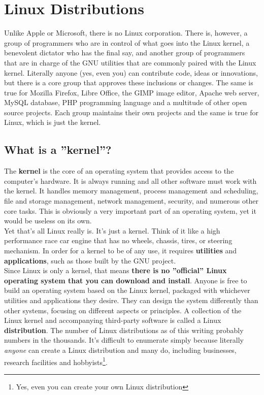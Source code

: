 \section{Linux Distributions}

Unlike Apple or Microsoft, there is no Linux corporation. There is, however, a group of programmers who are in control of what goes into the Linux kernel, a benevolent dictator who has the final say, and another group of programmers that are in charge of the GNU utilities that are commonly paired with the Linux kernel.  Literally anyone (yes, even you) can contribute code, ideas or innovations, but there is a core group that approves these inclusions or changes.  The same is true for Mozilla Firefox, Libre Office, the GIMP image editor, Apache web server, MySQL database, PHP programming language and a multitude of other open source projects.  Each group maintains their own projects and the same is true for Linux, which is just the kernel.\\

\subsection{What is a ''kernel''?}

The \textbf{kernel} is the core of an operating system that provides access to the computer's hardware.  It is always running and all other software must work with the kernel. It handles memory management, process management and scheduling, file and storage management, network management, security, and numerous other core tasks. This is obviously a very important part of an operating system, yet it would be useless on its own.\\

Yet that's all Linux really is. It's just a kernel. Think of it like a high performance race car engine that has no wheels, chassis, tires, or steering mechanism. In order for a kernel to be of any use, it requires \textbf{utilities} and \textbf{applications}, such as those built by the GNU project.\\

Since Linux is only a kernel, that means \textbf{there is no ''official'' Linux operating system that you can download and install}.  Anyone is free to build an operating system based on the Linux kernel, packaged with whichever utilities and applications they desire.  They can design the system differently than other systems, focusing on different aspects or principles.  A collection of the Linux kernel and accompanying third-party software is called a Linux \textbf{distribution}.  The number of Linux distributions as of this writing probably numbers in the thousands.  It's difficult to enumerate simply because literally \textit{anyone} can create a Linux distribution and many do, including businesses, research facilities and hobbyists\footnote{Yes, even you can create your own Linux distribution}.\\


